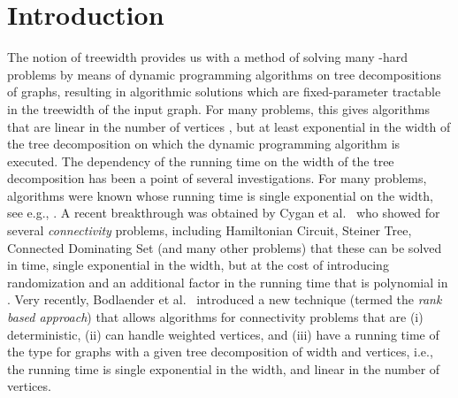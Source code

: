 \documentclass{llncs}
\begin{document}
\section{Introduction}
The notion of treewidth provides us with a method of solving many -hard problems by means of
dynamic programming algorithms on tree decompositions of graphs, resulting in
algorithmic solutions which are fixed-parameter tractable in the treewidth of the
input graph. For many problems, this gives algorithms that are linear in
the number of vertices , but at least exponential in the width of the tree
decomposition on which the dynamic programming algorithm is executed. 
The dependency of the running time on the width of the tree decomposition
has been a point of several investigations. For many problems, algorithms
were known whose running time is single exponential on the width,
see e.g., \cite{TelleP93}. A recent breakthrough was obtained
by Cygan et al.~\cite{CyganNPPRW11} who showed for several {\em
connectivity} problems, including {\sc Hamiltonian Circuit},
{\sc Steiner Tree}, {\sc Connected Dominating Set} (and many other problems)
that these can be solved in time, single exponential in the width, but at the
cost of introducing randomization and an additional factor in the running time that
is polynomial in . Very recently, Bodlaender et al.~\cite{BodlaenderCKN12}
introduced a new technique (termed the {\em rank based approach})
that allows algorithms for connectivity problems that are
(i) deterministic, (ii) can handle weighted vertices, and (iii) have a running time
of the type  for graphs with a given tree decomposition of width 
and  vertices, i.e., the running time is single exponential in the width, and
linear in the number of vertices. 
\end{document}
